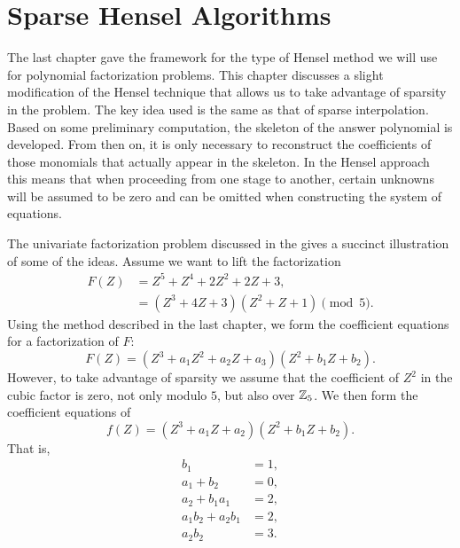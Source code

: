 \chapter{Sparse Hensel Algorithms}
\label{Sparse:Hensel:Chap}

The last chapter gave the framework for the type of Hensel method we
will use for polynomial factorization problems.  This chapter
discusses a slight modification of the Hensel technique that allows us
to take advantage of sparsity in the problem.  The key idea used is
the same as that of sparse interpolation.  Based on some preliminary
computation, the skeleton of the answer polynomial is developed.  From
then on, it is only necessary to reconstruct the coefficients of
those monomials that actually appear in the skeleton.  In the Hensel
approach this means that when proceeding from one stage to another,
certain unknowns will be assumed to be zero and can be omitted when
constructing the system of equations.

The univariate factorization problem discussed in the
 gives a succinct illustration of some of
the ideas.  Assume we want to lift the factorization
\[
\begin{aligned}
F(Z) & = Z^5 + Z^4 + 2Z^2 + 2Z + 3, \\
 & = (Z^3 + 4 Z + 3) (Z^2 + Z + 1) \pmod{5}.
\end{aligned}
\]
Using the method described in the last chapter, we form the
coefficient equations for a factorization of $F$:
\[
F(Z) = (Z^3 + a_1 Z^2 + a_2 Z + a_3) (Z^2 + b_1 Z + b_2).
\]
However, to take advantage of sparsity we assume that the
coefficient of $Z^2$ in the cubic factor is zero, not only modulo $5$,
but also over $\mathbb{Z}_5$.  We then form the coefficient equations of 
\begin{equation} \label{SPH:Mod5:Ex}
f(Z) = (Z^3 + a_1 Z + a_2) (Z^2 + b_1 Z + b_2).
\end{equation}
That is,
\begin{equation} \label{SPM:5Coef:Eq}
\begin{aligned}
b_1 & = 1, \\
a_1 + b_2 & = 0,\\
a_2 + b_1 a_1 & = 2, \\
a_1 b_2 + a_2 b_1 & = 2, \\
a_2 b_2 & = 3.
\end{aligned}
\end{equation}

